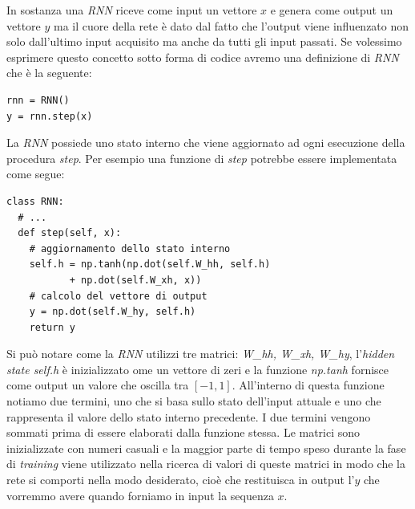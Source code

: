 \documentclass[a4paper,12pt,openright,twoside]{report}
\theoremstyle{definition}
\begin{document}
In sostanza una \emph{RNN} riceve come input un vettore $x$ e genera come output un vettore $y$ ma il cuore della rete
è dato dal fatto che l'output viene influenzato non solo dall'ultimo input acquisito ma anche da tutti gli 
input passati. Se volessimo esprimere questo concetto sotto forma di codice avremo una definizione di \emph{RNN}
che è la seguente:
\begin{verbatim}
rnn = RNN()
y = rnn.step(x)
\end{verbatim}
La \emph{RNN} possiede uno stato interno che viene aggiornato ad ogni esecuzione della procedura \emph{step}.
Per esempio una funzione di \emph{step} potrebbe essere implementata come segue:
\begin{verbatim}
class RNN:
  # ...
  def step(self, x):
    # aggiornamento dello stato interno
    self.h = np.tanh(np.dot(self.W_hh, self.h) 
           + np.dot(self.W_xh, x))
    # calcolo del vettore di output
    y = np.dot(self.W_hy, self.h)
    return y
\end{verbatim}

Si può notare come la \emph{RNN} utilizzi tre matrici: \emph{W\_hh, W\_xh, W\_hy}, l'\emph{hidden state self.h}
è inizializzato ome un vettore di zeri e la funzione \emph{np.tanh} fornisce come output un valore che oscilla tra $[-1,1]$.
All'interno di questa funzione notiamo due termini, uno che si basa sullo stato dell'input attuale e uno che 
rappresenta il valore dello stato interno precedente. I due termini vengono sommati prima di essere elaborati dalla 
funzione stessa.
Le matrici sono inizializzate con numeri casuali e la maggior parte di tempo speso durante la fase di
\emph{training} viene utilizzato nella ricerca di valori di queste matrici in modo che 
la rete si comporti nella modo desiderato, cioè che restituisca in output l'$y$ che vorremmo avere
quando forniamo in input la sequenza $x$.
\end{document}
